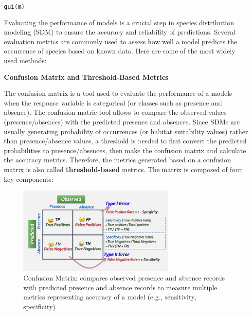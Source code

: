 \documentclass[
]{article}
\begin{document}
\texttt{gui(m)}

\hfill\break
\hfill\break
\hfill\break

\begin{mdframed}[backgroundcolor=gray!10, linecolor=black!75, linewidth=2pt, roundcorner=5pt, shadow=true,frametitle={\textbf{BOX 2: \uline{Model evaluations for SDMs}}}]

Evaluating the performance of models is a crucial step in species distribution modeling (SDM) to ensure the accuracy and reliability of predictions. Several evaluation metrics are commonly used to assess how well a model predicts the occurrence of species based on known data. Here are some of the most widely used methods:


\textbf{\large Confusion Matrix and Threshold-Based Metrics}

The confusion matrix is a tool used to evaluate the performance of a models when the response variable is categorical (or classes such as presence and absence). The confusion matric tool allows to compare the observed values (presence/absences) with the predicted presence and absences. Since SDMs are usually generating probability of occurrences (or habitat suitability values) rather than presence/absence values, a threshold is needed to first convert the predicted probabilities to presence/absences, then make the confusion matrix and calculate the accuracy metrics. Therefore, the metrics generated based on a confusion matrix is also called \textbf{threshold-based} metrics. The matrix is composed of four key components:


\begin{figure}[H]
    \centering
    \includegraphics[width=0.7\textwidth]{cmx.png}
    \caption{Confusion Matrix: compares observed presence and absence records with predicted presence and absence records to measure multiple metrics representing accuracy of a model (e.g., sensitivity, specificity) }
    \label{fig:Fig3}
\end{figure}




\end{mdframed}
\end{document}
